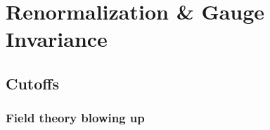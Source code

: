 \documentclass{book}
\theoremstyle{definition}
\begin{document}
\newpage









\section{Renormalization \& Gauge Invariance}




\subsection{Cutoffs}







\subsubsection{Field theory blowing up}
\end{document}
